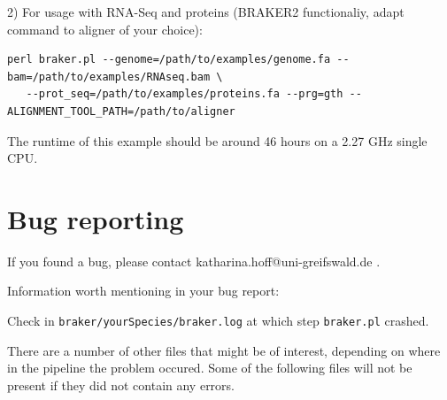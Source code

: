 \documentclass[a4paper,10pt]{report}
\begin{document}
2) For usage with RNA-Seq and proteins (BRAKER2 functionaliy, adapt command to aligner of your 
   choice):
   
   
\begin{verbatim}
perl braker.pl --genome=/path/to/examples/genome.fa --bam=/path/to/examples/RNAseq.bam \
   --prot_seq=/path/to/examples/proteins.fa --prg=gth --ALIGNMENT_TOOL_PATH=/path/to/aligner
\end{verbatim}
   
The runtime of this example should be around 46 hours on a 2.27 GHz single CPU.

\chapter{Bug reporting}


If you found a bug, please contact katharina.hoff@uni-greifswald.de .

Information worth mentioning in your bug report:

Check in \texttt{braker/yourSpecies/braker.log} at which step \texttt{braker.pl} crashed.

There are a number of other files that might be of interest, depending on where in the pipeline the
problem occured. Some of the following files will not be present if they did not contain any errors.
\end{document}
